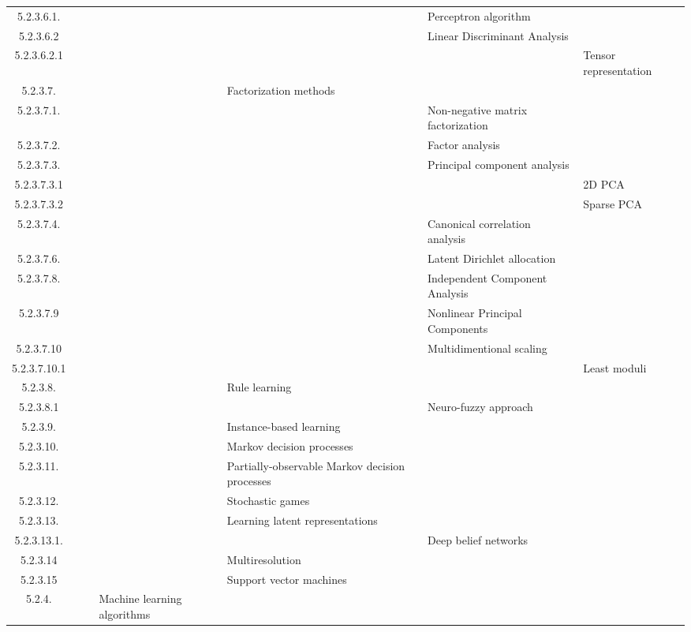 \documentclass[12pt]{article}
\begin{document}
\begin{center}
{\begin{tabularx}{\linewidth}{|c|X|X|X|X|X|X|}
		5.2.3.6.1. &   &   &   &   &  Perceptron algorithm &   \\
		5.2.3.6.2 &   &   &   &   &  Linear Discriminant Analysis &   \\
		5.2.3.6.2.1 &   &   &   &   &   &  Tensor representation \\
		5.2.3.7. &   &   &   &  Factorization methods &   &   \\
		5.2.3.7.1. &   &   &   &   &  Non-negative matrix factorization &   \\
		5.2.3.7.2. &   &   &   &   &  Factor analysis &   \\
		5.2.3.7.3. &   &   &   &   &  Principal component analysis &   \\
		5.2.3.7.3.1 &   &   &   &   &   &  2D PCA \\
		5.2.3.7.3.2 &   &   &   &   &   &  Sparse PCA \\
		5.2.3.7.4. &   &   &   &   &  Canonical correlation analysis &   \\
		5.2.3.7.6. &   &   &   &   &  Latent Dirichlet allocation &   \\
		5.2.3.7.8. &   &   &   &   &  Independent Component Analysis &   \\
		5.2.3.7.9 &   &   &   &   &  Nonlinear Principal Components &   \\
		5.2.3.7.10 &   &   &   &   &  Multidimentional scaling &   \\
		5.2.3.7.10.1 &   &   &   &   &   &  Least moduli \\
		5.2.3.8. &   &   &   &  Rule learning &   &   \\
		5.2.3.8.1 &   &   &   &   &  Neuro-fuzzy approach &   \\
		5.2.3.9. &   &   &   &  Instance-based learning &   &   \\
		5.2.3.10. &   &   &   &  Markov decision processes &   &   \\
		5.2.3.11. &   &   &   &  Partially-observable Markov decision processes &   &   \\
		5.2.3.12. &   &   &   &  Stochastic games &   &   \\
		5.2.3.13. &   &   &   &  Learning latent representations &   &   \\
		5.2.3.13.1. &   &   &   &   &  Deep belief networks &   \\
		5.2.3.14 &   &   &   &  Multiresolution &   &   \\
		5.2.3.15 &   &   &   &  Support vector machines &   &   \\
		5.2.4. &   &   &  Machine learning algorithms &   &   &   \\

\end{tabularx}}
\end{center}
\end{document}
